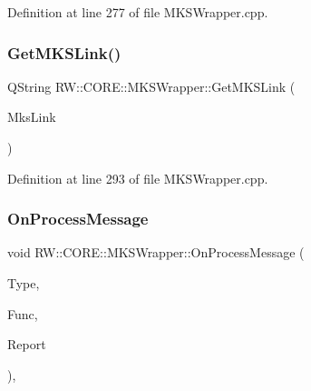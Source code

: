 Definition at line 277 of file M\+K\+S\+Wrapper.\+cpp.

\hypertarget{class_r_w_1_1_c_o_r_e_1_1_m_k_s_wrapper_af8af87ae9a71d99e47e90b880091a604}{}\label{class_r_w_1_1_c_o_r_e_1_1_m_k_s_wrapper_af8af87ae9a71d99e47e90b880091a604} 
\subsubsection{\texorpdfstring{Get\+M\+K\+S\+Link()}{GetMKSLink()}}
{\footnotesize\ttfamily Q\+String R\+W\+::\+C\+O\+R\+E\+::\+M\+K\+S\+Wrapper\+::\+Get\+M\+K\+S\+Link (\begin{DoxyParamCaption}\item[{Q\+String}]{Mks\+Link }\end{DoxyParamCaption})\hspace{0.3cm}{\ttfamily [private]}}



Definition at line 293 of file M\+K\+S\+Wrapper.\+cpp.

\hypertarget{class_r_w_1_1_c_o_r_e_1_1_m_k_s_wrapper_ad3fa59666812d348b35467c1aa8d02d6}{}\label{class_r_w_1_1_c_o_r_e_1_1_m_k_s_wrapper_ad3fa59666812d348b35467c1aa8d02d6} 
\subsubsection{\texorpdfstring{On\+Process\+Message}{OnProcessMessage}}
{\footnotesize\ttfamily void R\+W\+::\+C\+O\+R\+E\+::\+M\+K\+S\+Wrapper\+::\+On\+Process\+Message (\begin{DoxyParamCaption}\item[{Util\+::\+Message\+Receiver}]{Type,  }\item[{Util\+::\+Functions}]{Func,  }\item[{Q\+Byte\+Array}]{Report }\end{DoxyParamCaption})\hspace{0.3cm}{\ttfamily [virtual]}, {\ttfamily [slot]}}



